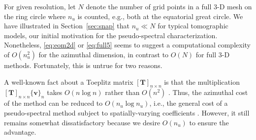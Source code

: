 \documentclass[extra]{gji}
\begin{document}
For given resolution, let $N$ denote the number of grid points 
in a full 3-D mesh on the ring circle where $n_u$ is counted, 
e.g., both at the equatorial great circle.   
We have illustrated in Section~\ref{sec:snap} that $n_u \ll N$
for typical tomographic models, 
our initial motivation for the pseudo-spectral characterization. 
Nonetheless, \eqref{eq:eom2d} or \eqref{eq:full5} seems to suggest a 
computational complexity of $O\left(n_u^2\right)$ for the azimuthal dimension, 
in contrast to $O\left(N\right)$ for full 3-D methods. 
Fortunately, this is untrue for two reasons.

A well-known fact about a Toeplitz matrix $[\mathbf{T}]_{n\times n}$ 
is that the multiplication $[\mathbf{T}]_{n\times n}\{\mathbf{v}\}_n$ 
takes $O\left(n\log n\right)$ rather than $O\left(n^2\right)$ \cite[Chap 4,][]{golub2012matrix}. 
Thus, the azimuthal cost of the method can be reduced to 
$O\left(n_u\log n_u\right)$, i.e., the general cost of a pseudo-spectral method
subject to spatially-varying coefficients \cite[Chap 9,][]{boyd2001spectral}.
However, it still remains somewhat dissatisfactory 
because we desire $O\left(n_u\right)$ to ensure the advantage. 
\end{document}
